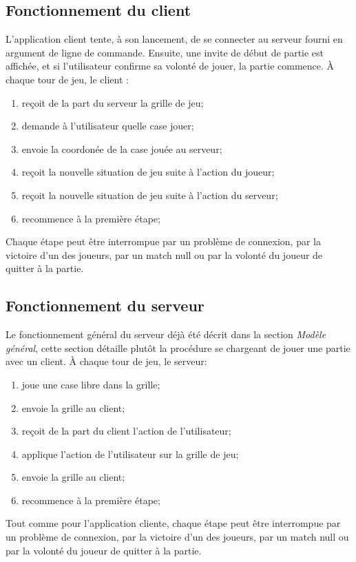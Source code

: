 \documentclass[a4paper]{article}
\begin{document}
\subsection{Fonctionnement du client}
L'application client tente, à son lancement, de se connecter au serveur fourni en argument de ligne de commande.
Ensuite, une invite de début de partie est affichée, et si l'utilisateur confirme sa volonté de jouer, la partie commence.
À chaque tour de jeu, le client :
\begin{enumerate}
	\item reçoit de la part du serveur la grille de jeu;
	\item demande à l'utilisateur quelle case jouer;
	\item envoie la coordonée de la case jouée au serveur;
	\item reçoit la nouvelle situation de jeu suite à l'action du joueur;
	\item reçoit la nouvelle situation de jeu suite à l'action du serveur;
	\item recommence à la première étape;
\end{enumerate}
Chaque étape peut être interrompue par un problème de connexion, par la victoire d'un des joueurs, par un match null ou par la volonté du joueur
de quitter à la partie.


\subsection{Fonctionnement du serveur}
Le fonctionnement général du serveur déjà été décrit dans la section \textit{Modèle général}, cette section détaille plutôt
la procédure se chargeant de jouer une partie avec un client.
À chaque tour de jeu, le serveur:
\begin{enumerate}
	\item joue une case libre dans la grille;
	\item envoie la grille au client;
	\item reçoit de la part du client l'action de l'utilisateur;
	\item applique l'action de l'utilisateur sur la grille de jeu;
	\item envoie la grille au client;
	\item recommence à la première étape;
\end{enumerate}
Tout comme pour l'application cliente, chaque étape peut être interrompue par
un problème de connexion, par la victoire d'un des joueurs, par un match null ou par la volonté du joueur
de quitter à la partie.
\end{document}
